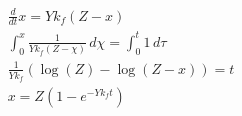 \begin{align}
  \frac{d}{d t} x = Y k_{f} \left(Z - x\right) \\
  \int_{0}^{x} \frac{1}{Y k_{f} \left(Z - \chi\right)}\, d\chi = \int_{0}^{t} 1\, d\tau \\
  \frac{1}{Y k_{f}} \left(\log{\left (Z \right )} - \log{\left (Z - x \right )}\right) = t \\
  x = Z \left(1 - e^{- Y k_{f} t}\right)
\end{align}

